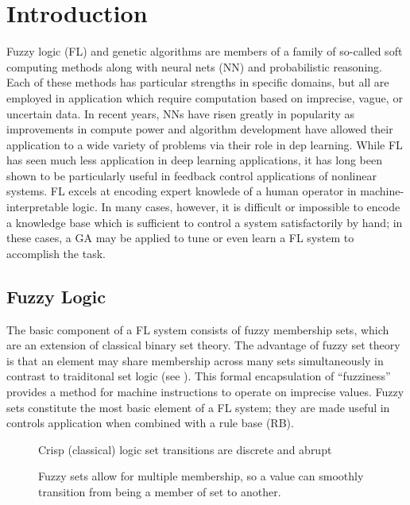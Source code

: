 \chapter{Introduction}
Fuzzy logic (FL) and genetic algorithms are members of a family of so-called soft computing methods along with
neural nets (NN) and probabilistic reasoning\cite{cordon:01bk}. Each of these methods has particular strengths
in specific domains, but all are employed in application which require computation based on imprecise, vague,
or uncertain data. In recent years, NNs have risen greatly in popularity as improvements in compute power and
algorithm development have allowed their application to a wide variety of problems via their role in dep
learning\cite{Goodfellow-et-al-2016}. While FL has seen much less application in deep learning applications,
it has long been shown to be particularly useful in feedback control applications of nonlinear
systems\cite{MAMDANI19751}. FL excels at encoding expert knowlede of a human operator in machine-interpretable
logic. In many cases, however, it is difficult or impossible to encode a knowledge base which is sufficient to
control a system satisfactorily by hand; in these cases, a GA may be applied to tune or even learn a FL system
to accomplish the task.

\section{Fuzzy Logic}
The basic component of a FL system consists of fuzzy membership sets\cite{ZADEH1965338}, which are an
extension of classical binary set theory. The advantage of fuzzy set theory is that an element may share
membership across many sets simultaneously in contrast to traiditonal set logic (see
). This formal encapsulation of ``fuzziness'' provides a method for
machine instructions to operate on imprecise values. Fuzzy sets constitute the most basic element of a FL
system; they are made useful in controls application when combined with a rule base (RB).

\begin{figure}[ht]
    \centering
    
    \caption{Crisp (classical) logic set transitions are discrete and abrupt}\label{f:crispsets}
\end{figure}

\begin{figure}[ht]
    \centering
    
    \caption{Fuzzy sets allow for multiple membership, so a value can smoothly transition from being a member
    of set to another.}\label{f:fuzzysets}
\end{figure}

